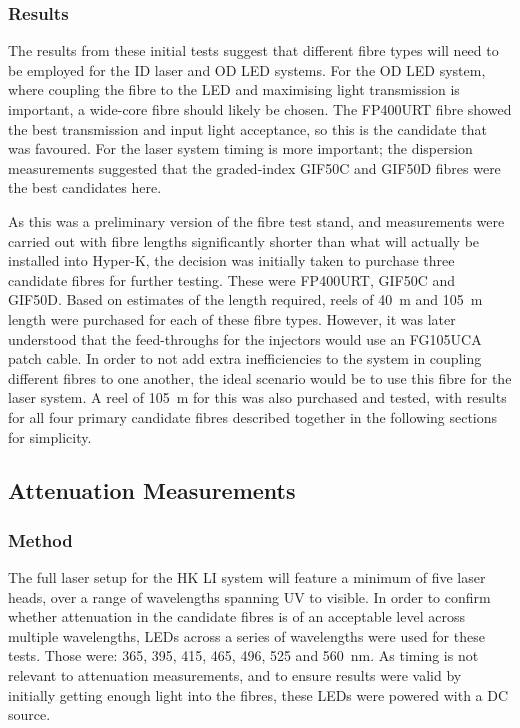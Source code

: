 \documentclass[a4paper,11pt]{article}
\begin{document}
\subsubsection{Results}

The results from these initial tests suggest that different fibre types will need to be employed for the ID laser and OD LED systems. For the OD LED system, where coupling the fibre to the LED and maximising light transmission is important, a wide-core fibre should likely be chosen. The FP400URT fibre showed the best transmission and input light acceptance, so this is the candidate that was favoured. For the laser system timing is more important; the dispersion measurements suggested that the graded-index GIF50C and GIF50D fibres were the best candidates here.

As this was a preliminary version of the fibre test stand, and measurements were carried out with fibre lengths significantly shorter than what will actually be installed into Hyper-K, the decision was initially taken to purchase three candidate fibres for further testing. These were FP400URT, GIF50C and GIF50D. Based on estimates of the length required, reels of 40~m and 105~m length were purchased for each of these fibre types. However, it was later understood that the feed-throughs for the injectors would use an FG105UCA patch cable. In order to not add extra inefficiencies to the system in coupling different fibres to one another, the ideal scenario would be to use this fibre for the laser system. A reel of 105~m for this was also purchased and tested, with results for all four primary candidate fibres described together in the following sections for simplicity.


\subsection{Attenuation Measurements}

\subsubsection{Method}\label{sec:fibre:sub:att:sub:method}

The full laser setup for the HK LI system will feature a minimum of five laser heads, over a range of wavelengths spanning UV to visible. In order to confirm whether attenuation in the candidate fibres is of an acceptable level across multiple wavelengths, LEDs across a series of wavelengths were used for these tests. Those were: 365, 395, 415, 465, 496, 525 and 560~nm. As timing is not relevant to attenuation measurements, and to ensure results were valid by initially getting enough light into the fibres, these LEDs were powered with a DC source.
\end{document}
